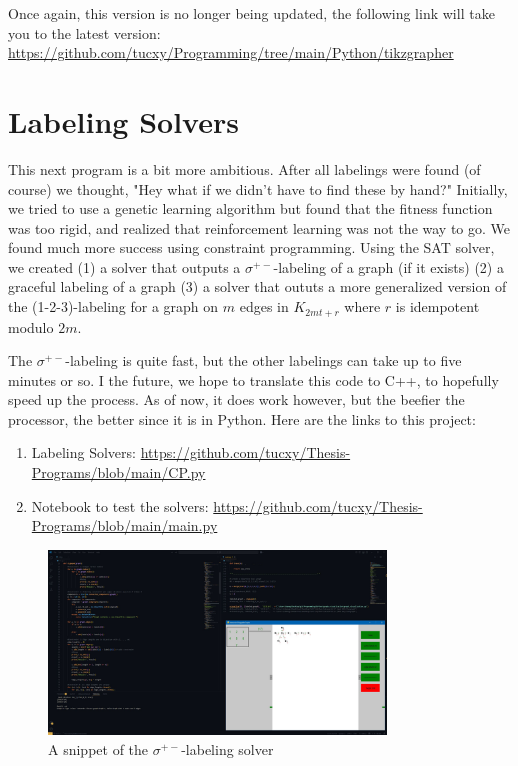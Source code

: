 Once again, this version is no longer being updated, the following link will take you to the latest version: \url{https://github.com/tucxy/Programming/tree/main/Python/tikzgrapher} \newline

\section{Labeling Solvers}
This next program is a bit more ambitious. After all labelings were found (of course) we thought, "Hey what if we didn't have to find these by hand?" Initially, we tried to use a genetic learning algorithm but found that the fitness function was too rigid, and realized that reinforcement learning was not the way to go. We found much more success using constraint programming. Using the  SAT solver, we created (1) a solver that outputs a $\sigma^{+-}$-labeling of a graph (if it exists) (2) a graceful labeling of a graph (3) a solver that oututs a more generalized version of the (1-2-3)-labeling for a graph on $m$ edges in $K_{2mt+r}$ where $r$ is idempotent modulo $2m$.



The $\sigma^{+-}$-labeling is quite fast, but the other labelings can take up to five minutes or so. I the future, we hope to translate this code to C++, to hopefully speed up the process. As of now, it does work however, but the beefier the processor, the better since it is in Python. Here are the links to this project:

\begin{enumerate}
  \item  Labeling Solvers: \url{https://github.com/tucxy/Thesis-Programs/blob/main/CP.py}
  \item  Notebook to test the solvers: \url{https://github.com/tucxy/Thesis-Programs/blob/main/main.py}
\end{enumerate}

\begin{figure}[H]
  \begin{center}
  \includegraphics[width=0.8\textwidth]{standalone/Images/CPsnippetlong.JPG}
  \caption{A snippet of the $\sigma^{+-}$-labeling solver}
  \label{fig:CPsnippet}
  \end{center}
\end{figure}


